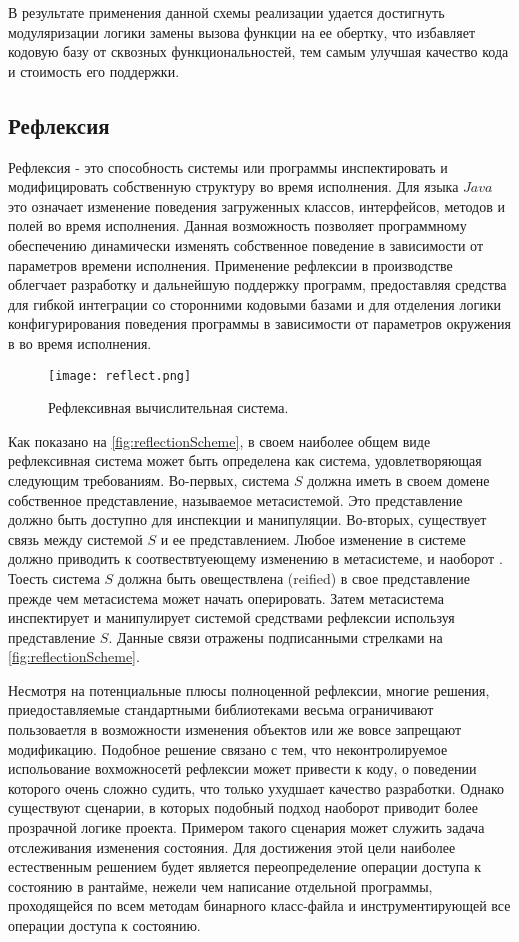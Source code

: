 В результате применения данной схемы реализации удается достигнуть модуляризации логики замены вызова функции на ее обертку, что избавляет кодовую базу от сквозных функциональностей, тем самым улучшая качество кода и стоимость его поддержки.

\subsection{Рефлексия}

Рефлексия - это способность системы или программы инспектировать и модифицировать собственную структуру во время исполнения. Для языка $Java$ это означает изменение поведения загруженных классов, интерфейсов, методов и полей во время исполнения. Данная возможность позволяет программному обеспечению динамически изменять собственное поведение в зависимости от параметров времени исполнения. Применение рефлексии в производстве облегчает разработку и дальнейшую поддержку программ, предоставляя средства для гибкой интеграции со сторонними кодовыми базами и для отделения логики конфигурирования поведения программы в зависимости от параметров окружения в во время исполнения.

\begin{figure}[h]
\centering
\texttt{[image: reflect.png]}
\caption{Рефлексивная вычислительная система.}
\label{fig:reflectionScheme}
\end{figure}

Как показано на \autoref{fig:reflectionScheme}, в своем наиболее общем виде рефлексивная система может быть определена как система, удовлетворяющая следующим требованиям. Во-первых, система $S$ должна иметь в своем домене собственное представление, называемое метасистемой. Это представление должно быть доступно для инспекции и манипуляции. Во-вторых, существует связь между системой $S$ и ее представлением. Любое изменение в системе должно приводить к соотвествтуеющему изменению в метасистеме, и наоборот \cite{javaReflection}. Тоесть система $S$ должна быть овеществлена (reified) в свое представление прежде чем метасистема может начать оперировать. Затем метасистема инспектирует и манипулирует системой средствами рефлексии используя представление $S$. Данные связи отражены подписанными стрелками на \autoref{fig:reflectionScheme}.

Несмотря на потенциальные плюсы полноценной рефлексии, многие решения, приедоставляемые стандартными библиотеками весьма ограничивают пользоваетля в возможности изменения объектов или же вовсе запрещают модификацию. Подобное решение связано с тем, что неконтролируемое испольование вохможносетй рефлексии может привести к коду, о поведении которого очень сложно судить, что только ухудшает качество разработки. Однако существуют сценарии, в которых подобный подход наоборот приводит более прозрачной логике проекта. Примером такого сценария может служить задача отслеживания изменения состояния. Для достижения этой цели наиболее естественным решением будет является переопределение операции доступа к состоянию в рантайме, нежели чем написание отдельной программы, проходящейся по всем методам бинарного класс-файла и инструментирующей все операции доступа к состоянию.

